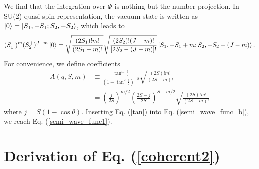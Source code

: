 \documentclass[11pt]{book} %
\begin{document}
We find that the integration over $\Phi$ is nothing but the number projection.
In SU(2) quasi-spin representation, the vacuum state is written as
$\ket{0}=\ket{S_1,-S_1;S_2,-S_2}$, which leads to
\begin{align}
  (S_1^{+})^m(S_2^{+})^{J-m} \ket{0} 
  = \sqrt{\frac{(2S_1)!m!}{(2S_1-m)!}} \sqrt{\frac{(2S_2)!(J-m)!}{[2S_2-(J-m)]!}}
  \ket{S_1,-S_1+m;S_2,-S_2+(J-m)}.
\end{align}
For convenience, we define coefficients
\begin{align}
  A(q,S,m) &\equiv 
  \frac{\tan^m{\frac{\theta}{2}}}{\left(1+\tan^2{\frac{\theta}{2}}\right)^{-S}}
  \sqrt{\frac{(2S)!m!}{(2S-m)!}}  \nonumber \\
  &= \left(\frac{j}{2S}\right)^{m/2}\left(\frac{2S-j}{2S}\right)^{S-m/2}
 \sqrt{\frac{(2S)!m!}{(2S-m)!}}
\label{tan}
\end{align}
where $j=S(1-\cos{\theta})$.
Inserting Eq. (\ref{tan}) into Eq. (\ref{semi_wave_func_b}),
we reach Eq. (\ref{semi_wave_func1}).


\section{Derivation of Eq. (\ref{coherent2})}
\label{wave_func2}
\end{document}
